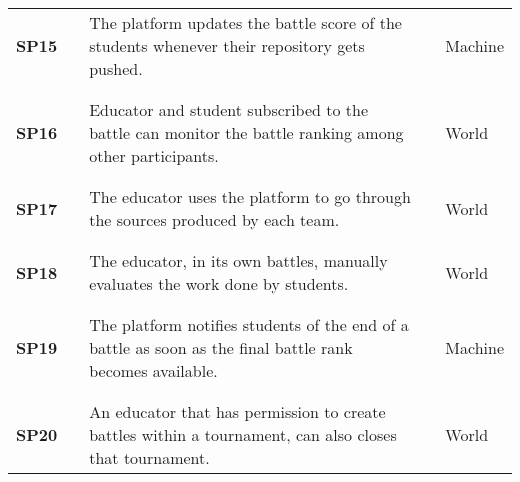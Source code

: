 \begin{longtable}[H]{l l p{8.5cm} l l}
    \textbf{SP15} & \vline & The platform updates the battle score of the students whenever their repository gets pushed.                                   & \vline & Machine                \\
                  &        &                                                                                                                                &        &                        \\\hline & & \\
    \textbf{SP16} & \vline & Educator and student subscribed to the battle can monitor the battle ranking among other participants.                         & \vline & World                  \\
                  &        &                                                                                                                                &        &                        \\\hline & & \\
    \textbf{SP17} & \vline & The educator uses the platform to go through the sources produced by each team.                                                & \vline & World                  \\
                  &        &                                                                                                                                &        &                        \\\hline & & \\
    \textbf{SP18} & \vline & The educator, in its own battles, manually evaluates the work done by students.                                                & \vline & World                  \\
                  &        &                                                                                                                                &        &                        \\\hline & & \\
    \textbf{SP19} & \vline & The platform notifies students of the end of a battle as soon as the final battle rank becomes available.                      & \vline & Machine                \\
                  &        &                                                                                                                                &        &                        \\\hline & & \\
    \textbf{SP20} & \vline & An educator that has permission to create battles within a tournament, can also closes that tournament.                        & \vline & World                  \\

\end{longtable}
